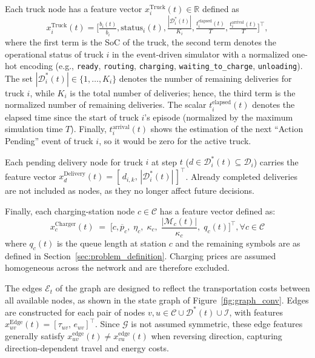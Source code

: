 \documentclass[journal]{IEEEtran}
\begin{document}
Each truck node has a feature vector $x^{\mathrm{Truck}}_i(t)\in\mathbb{R}$ defined as
\begin{equation}
x^{\mathrm{Truck}}_i(t)=
\Big[
\tfrac{b_i(t)}{\overline{b}_i},
\text{status}_i(t),
\tfrac{|\mathcal{D}^*_i(t)|}{K_i},
\tfrac{t_i^{\text{elapsed}}(t)}{T},
\tfrac{t_i^{\text{arrival}}(t)}{T}
\Big]^\top\!\!,
\label{eq:truck_features}
\end{equation}
where the first term is the SoC of the truck, the second term denotes the operational status of truck $i$ in the event-driven simulator with a normalized one-hot encoding (e.g., \texttt{ready}, \texttt{routing}, \texttt{charging}, \texttt{waiting\_to\_charge}, \texttt{unloading}).
The set $|\mathcal{D}^*_i(t)| \in \{1,\dots, {K_i}\}$ denotes the number of remaining deliveries for truck $i$, while $K_i$ is the total number of deliveries; hence, the third term is the normalized number of remaining deliveries. The scalar $t_i^{\text{elapsed}}(t)$ denotes the elapsed time since the start of truck $i$'s episode (normalized by the maximum simulation time $T$).
Finally, $t_i^{\text{arrival}}(t)$ shows the estimation of the next ``Action Pending'' event of truck $i$, so it would be zero for the active truck. 

Each pending delivery node for truck $i$ at step $t$ ($d\in\mathcal{D}^*_i(t) \subseteq \mathcal{D}_i$) carries the feature vector $x^{\mathrm{Delivery}}_d(t)=[\,d_{i,k},\,|\mathcal{D}^{*}_{i}(t)|\,]^\top$. Already completed deliveries are not included as nodes, as they no longer affect future decisions.

Finally, each charging-station node $c\in\mathcal{C}$ has a feature vector defined as:
\begin{equation}
x^{\mathrm{Charger}}_c(t)\;=\;
\Big[
c,
\overline{p}_c,\;
\eta_c,\;
\kappa_c,\;
\frac{|\mathcal{M}_c(t)|}{\kappa_c},\;
q_c(t)
\Big]^\top,
\forall c \in \mathcal{C}
\label{eq:charger_features}
\end{equation}
 where $q_c(t)$ is the queue length at station $c$ and the remaining symbols are as defined in Section~\ref{sec:problem_definition}. Charging prices are assumed homogeneous across the network and are therefore excluded.

The edges $\mathcal{E}_t$ of the graph are designed to reflect the transportation costs between all available nodes, as shown in the state graph of Figure~\ref{fig:graph_conv}.
Edges are constructed for each pair of nodes $v,u\in\mathcal{C}\cup\mathcal{D}^*(t)\cup\mathcal{I}$, with features $x^{\mathrm{Edge}}_{uv}(t)=[\tau_{uv},\, e_{uv}]^\top$.
Since $\mathcal{G}$ is not assumed symmetric, these edge features generally satisfy $x^{\mathrm{edge}}_{uv}(t)\neq x^{\mathrm{edge}}_{vu}(t)$ when reversing direction, capturing direction-dependent travel and energy costs.
\end{document}
